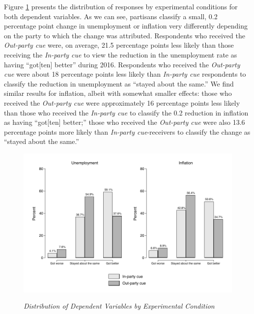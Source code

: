 \documentclass[12pt, letterpaper]{article}
\begin{document}
Figure \ref{fig:combined_exp} presents the distribution of responses by experimental conditions for both dependent variables. As we can see, partisans classify a small, 0.2 percentage point change in unemployment or inflation very differently depending on the party to which the change was attributed. Respondents who received the \textit{Out-party cue} were, on average, 21.5 percentage points less likely than those receiving the \textit{In-party cue} to view the reduction in the unemployment rate as having ``got[ten] better'' during 2016. Respondents who received the \textit{Out-party cue} were about 18 percentage points less likely than \textit{In-party cue} respondents to classify the reduction in unemployment as ``stayed about the same.'' We find similar results for inflation, albeit with somewhat smaller effects: those who received the \textit{Out-party cue} were approximately 16 percentage points less likely than those who received the \textit{In-party cue} to classify the 0.2 reduction in inflation as having ``got[ten] better;'' those who received the \textit{Out-party cue} were also 13.6 percentage points more likely than \textit{In-party cue}-receivers to classify the change as ``stayed about the same.''


\begin{center}
\begin{figure}[H]
  \centering
  \caption{\textit{Distribution of Dependent Variables by Experimental Condition}}
  \includegraphics[width=\textwidth]{../figs/combined_nontroll.pdf}
  \label{fig:combined_exp}
\end{figure}
\end{center}

\vspace{-2.5cm}
\end{document}
